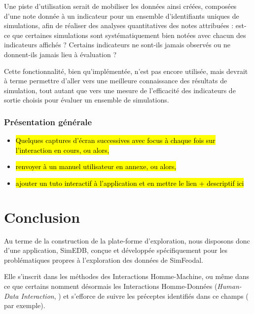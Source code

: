 			Une piste d'utilisation serait de mobiliser les données ainsi créées, composées d'une note donnée à un indicateur pour un ensemble d'identifiants uniques de simulations, afin de réaliser des analyses quantitatives des notes attribuées : est-ce que certaines simulations sont systématiquement bien notées avec chacun des indicateurs affichés ? Certains indicateurs ne sont-ils jamais observés ou ne donnent-ils jamais lieu à évaluation ?
			
			Cette fonctionnalité, bien qu'implémentée, n'est pas encore utilisée, mais devrait à terme permettre d'aller vers une meilleure connaissance des résultats de simulation, tout autant que vers une mesure de l'efficacité des indicateurs de sortie choisis pour évaluer un ensemble de simulations.

		\subsubsection{Présentation générale}
			 
			 	\begin{itemize}
			 		\item \hl{Quelques captures d'écran successives avec focus à chaque fois sur l'interaction en cours, ou alors,}
			 		\item \hl{renvoyer à un manuel utilisateur en annexe, ou alors,}
			 		\item \hl{ajouter un tuto interactif à l'application et en mettre le lien + descriptif ici}
			 	\end{itemize}
			
	\section*{Conclusion}
	
	Au terme de la construction de la plate-forme d'exploration, nous disposons donc d'une application, SimEDB, conçue et développée spécifiquement pour les problématiques propres à l'exploration des données de SimFeodal.
	
	Elle s'inscrit dans les méthodes des Interactions Homme-Machine, ou même dans ce que certains nomment désormais les \og Interactions Homme-Données\fg{} (\og \textit{Human-Data Interaction}\fg{}, \cite{elmqvist_embodied_2011,mortier_human-data_2014}) et s'efforce de suivre les préceptes identifiés dans ce champs (\cite[167-170]{amirpour_amraii_human-data_2018} par exemple).
	
